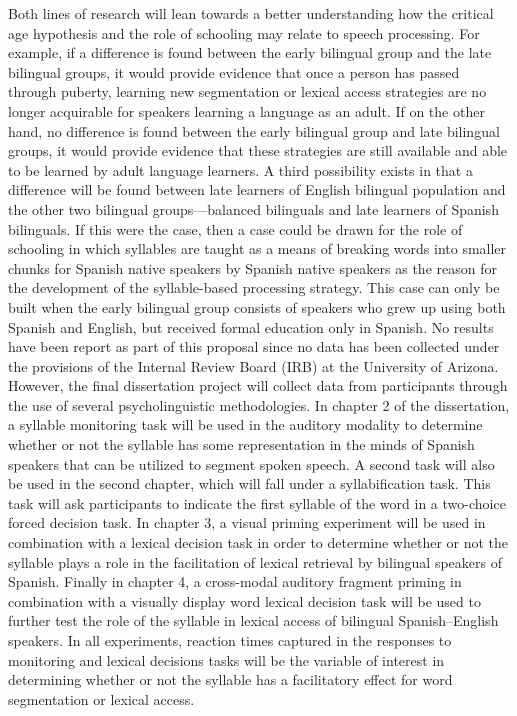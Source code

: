 \documentclass[
12pt, %
english, %
doublespacing, %
nolistspacing, %
liststotoc, %
headsepline, %
chapterinoneline, %
openany, %
]{DoctoralThesis}\usepackage[]{graphicx}\usepackage[]{color}
\begin{document}
Both lines of research will lean towards a better understanding how the critical age hypothesis and the role of schooling may relate to speech processing. For example, if a difference is found between the early bilingual group and the late bilingual groups, it would provide evidence that once a person has passed through puberty, learning new segmentation or lexical access strategies are no longer acquirable for speakers learning a language as an adult. If on the other hand, no difference is found between the early bilingual group and late bilingual groups, it would provide evidence that these strategies are still available and able to be learned by adult language learners. A third possibility exists in that a difference will be found between late learners of English bilingual population and the other two bilingual groups—balanced bilinguals and late learners of Spanish bilinguals. If this were the case, then a case could be drawn for the role of schooling in which syllables are taught as a means of breaking words into smaller chunks for Spanish native speakers by Spanish native speakers as the reason for the development of the syllable-based processing strategy. This case can only be built when the early bilingual group consists of speakers who grew up using both Spanish and English, but received formal education only in Spanish.
No results have been report as part of this proposal since no data has been collected under the provisions of the Internal Review Board (IRB) at the University of Arizona. However, the final dissertation project will collect data from participants through the use of several psycholinguistic methodologies. In chapter 2 of the dissertation, a syllable monitoring task will be used in the auditory modality to determine whether or not the syllable has some representation in the minds of Spanish speakers that can be utilized to segment spoken speech. A second task will also be used in the second chapter, which will fall under a syllabification task. This task will ask participants to indicate the first syllable of the word in a two-choice forced decision task. In chapter 3, a visual priming experiment will be used in combination with a lexical decision task in order to determine whether or not the syllable plays a role in the facilitation of lexical retrieval by bilingual speakers of Spanish. Finally in chapter 4, a cross-modal auditory fragment priming in combination with a visually display word lexical decision task will be used to further test the role of the syllable in lexical access of bilingual Spanish–English speakers. In all experiments, reaction times captured in the responses to monitoring and lexical decisions tasks will be the variable of interest in determining whether or not the syllable has a facilitatory effect for word segmentation or lexical access.
\end{document}

